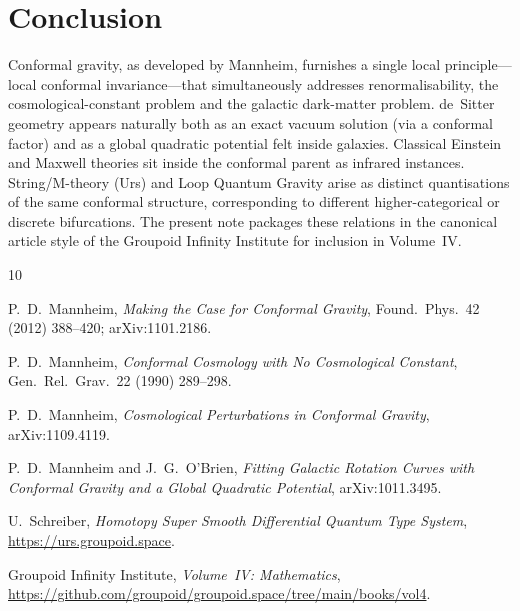 \documentclass{article}
\begin{document}
\section{Conclusion}
\label{sec:conclusion}

Conformal gravity, as developed by Mannheim, furnishes a single local principle---local conformal invariance---that simultaneously addresses renormalisability, the cosmological-constant problem and the galactic dark-matter problem. de~Sitter geometry appears naturally both as an exact vacuum solution (via a conformal factor) and as a global quadratic potential felt inside galaxies. Classical Einstein and Maxwell theories sit inside the conformal parent as infrared instances. String/M-theory (Urs) and Loop Quantum Gravity arise as distinct quantisations of the same conformal structure, corresponding to different higher-categorical or discrete bifurcations. The present note packages these relations in the canonical article style of the Groupoid Infinity Institute for inclusion in Volume~IV.


\begin{thebibliography}{10}

P.~D.\ Mannheim,
\textit{Making the Case for Conformal Gravity},
Found.\ Phys.\ 42 (2012) 388--420;
arXiv:1101.2186.

P.~D.\ Mannheim,
\textit{Conformal Cosmology with No Cosmological Constant},
Gen.\ Rel.\ Grav.\ 22 (1990) 289--298.

P.~D.\ Mannheim,
\textit{Cosmological Perturbations in Conformal Gravity},
arXiv:1109.4119.

P.~D.\ Mannheim and J.~G.\ O'Brien,
\textit{Fitting Galactic Rotation Curves with Conformal Gravity and a Global Quadratic Potential},
arXiv:1011.3495.

U.~Schreiber,
\textit{Homotopy Super Smooth Differential Quantum Type System},
\url{https://urs.groupoid.space}.

Groupoid Infinity Institute,
\textit{Volume~IV: Mathematics},
\url{https://github.com/groupoid/groupoid.space/tree/main/books/vol4}.

\end{thebibliography}
\end{document}
